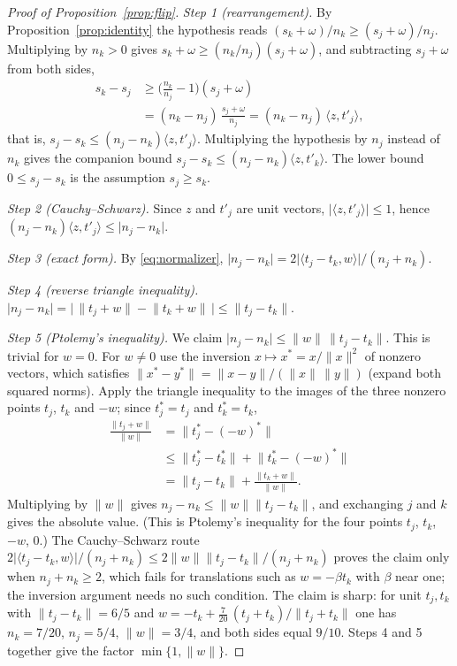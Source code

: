 \begin{proof}[Proof of Proposition~\ref{prop:flip}]
\emph{Step 1 (rearrangement).} By Proposition~\ref{prop:identity} the
hypothesis reads $(s_k+\omega)/n_k\ge(s_j+\omega)/n_j$. Multiplying by $n_k>0$ gives
$s_k+\omega\ge(n_k/n_j)(s_j+\omega)$, and subtracting $s_j+\omega$ from both sides,
\begin{align*}
s_k-s_j&\ge\Big(\frac{n_k}{n_j}-1\Big)(s_j+\omega)\\
&=(n_k-n_j)\,\frac{s_j+\omega}{n_j}=(n_k-n_j)\,\langle z,t'_j\rangle ,
\end{align*}
that is, $s_j-s_k\le(n_j-n_k)\langle z,t'_j\rangle$. Multiplying the
hypothesis by $n_j$ instead of $n_k$ gives the companion bound
$s_j-s_k\le(n_j-n_k)\langle z,t'_k\rangle$. The lower bound $0\le s_j-s_k$
is the assumption $s_j\ge s_k$.

\emph{Step 2 (Cauchy--Schwarz).} Since $z$ and $t'_j$ are unit vectors,
$\lvert\langle z,t'_j\rangle\rvert\le1$, hence
$(n_j-n_k)\langle z,t'_j\rangle\le\lvert n_j-n_k\rvert$.

\emph{Step 3 (exact form).} By \eqref{eq:normalizer},
$\lvert n_j-n_k\rvert=2\lvert\langle t_j-t_k,w\rangle\rvert/(n_j+n_k)$.

\emph{Step 4 (reverse triangle inequality).}
$\lvert n_j-n_k\rvert=\big\lvert\,\lVert t_j+w\rVert-\lVert t_k+w\rVert\,\big\rvert
\le\lVert t_j-t_k\rVert$.

\emph{Step 5 (Ptolemy's inequality).} We claim
$\lvert n_j-n_k\rvert\le\lVert w\rVert\,\lVert t_j-t_k\rVert$. This is
trivial for $w=0$. For $w\ne0$ use the inversion $x\mapsto x^{\ast}=x/\lVert
x\rVert^2$ of nonzero vectors, which satisfies
$\lVert x^{\ast}-y^{\ast}\rVert=\lVert x-y\rVert/(\lVert x\rVert\,\lVert
y\rVert)$ (expand both squared norms). Apply the triangle inequality to the
images of the three nonzero points $t_j$, $t_k$ and $-w$; since
$t_j^{\ast}=t_j$ and $t_k^{\ast}=t_k$,
\begin{align*}
\frac{\lVert t_j+w\rVert}{\lVert w\rVert}
&=\lVert t_j^{\ast}-(-w)^{\ast}\rVert\\
&\le\lVert t_j^{\ast}-t_k^{\ast}\rVert+\lVert t_k^{\ast}-(-w)^{\ast}\rVert\\
&=\lVert t_j-t_k\rVert+\frac{\lVert t_k+w\rVert}{\lVert w\rVert}.
\end{align*}
Multiplying by $\lVert w\rVert$ gives $n_j-n_k\le\lVert w\rVert\lVert
t_j-t_k\rVert$, and exchanging $j$ and $k$ gives the absolute value. (This is
Ptolemy's inequality for the four points $t_j$, $t_k$, $-w$, $0$.) The
Cauchy--Schwarz route
$2\lvert\langle t_j-t_k,w\rangle\rvert/(n_j+n_k)\le
2\lVert w\rVert\lVert t_j-t_k\rVert/(n_j+n_k)$ proves the claim only when
$n_j+n_k\ge2$, which fails for translations such as $w=-\beta t_k$ with
$\beta$ near one; the inversion argument needs no such condition. The claim
is sharp: for unit $t_j,t_k$ with $\lVert t_j-t_k\rVert=6/5$ and
$w=-t_k+\tfrac{7}{20}\,(t_j+t_k)/\lVert t_j+t_k\rVert$ one has
$n_k=7/20$, $n_j=5/4$, $\lVert w\rVert=3/4$, and both sides equal $9/10$.
Steps 4 and 5 together give the factor $\min\{1,\lVert w\rVert\}$.


\end{proof}
